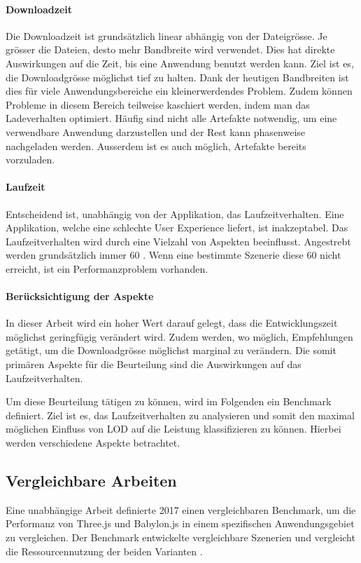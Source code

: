 \paragraph{Downloadzeit}

Die Downloadzeit ist grundsätzlich linear abhängig von der Dateigrösse.
Je grösser die Dateien, desto mehr Bandbreite wird verwendet. Dies hat direkte Auswirkungen auf die Zeit, bis eine Anwendung benutzt werden kann. Ziel ist es, die Downloadgrösse möglichst tief zu halten.
Dank der heutigen Bandbreiten ist dies für viele Anwendungsbereiche ein kleinerwerdendes Problem.
Zudem können Probleme in diesem Bereich teilweise kaschiert werden, indem man das Ladeverhalten optimiert. Häufig sind nicht alle Artefakte notwendig, um eine verwendbare Anwendung darzustellen und der Rest kann phasenweise nachgeladen werden.
Ausserdem ist es auch möglich, Artefakte bereits vorzuladen.

\paragraph{Laufzeit}

Entscheidend ist, unabhängig von der Applikation, das Laufzeitverhalten. Eine Applikation, welche eine schlechte User Experience liefert, ist inakzeptabel.
Das Laufzeitverhalten wird durch eine Vielzahl von Aspekten beeinflusst.
Angestrebt werden grundsätzlich immer 60 . Wenn eine bestimmte Szenerie diese 60  nicht erreicht, ist ein Performanzproblem vorhanden.

\paragraph{Berücksichtigung der Aspekte}
In dieser Arbeit wird ein hoher Wert darauf gelegt, dass die Entwicklungszeit möglichst geringfügig verändert wird. Zudem werden, wo möglich, Empfehlungen getätigt, um die Downloadgrösse möglichst marginal zu verändern.
Die somit primären Aspekte für die Beurteilung sind die Auswirkungen auf das Laufzeitverhalten.

Um diese Beurteilung tätigen zu können, wird im Folgenden ein Benchmark definiert. Ziel ist es, das Laufzeitverhalten zu analysieren und somit den maximal möglichen Einfluss von LOD auf die Leistung klassifizieren zu können. Hierbei werden verschiedene Aspekte betrachtet.

\subsection{Vergleichbare Arbeiten}
Eine unabhängige Arbeit definierte 2017 einen vergleichbaren Benchmark, um die Performanz von Three.js und Babylon.js in einem spezifischen Anwendungsgebiet zu vergleichen. Der Benchmark entwickelte vergleichbare Szenerien und vergleicht die Ressourcennutzung der beiden Varianten \cite{performanceComparisonBabylonThreejs}.

